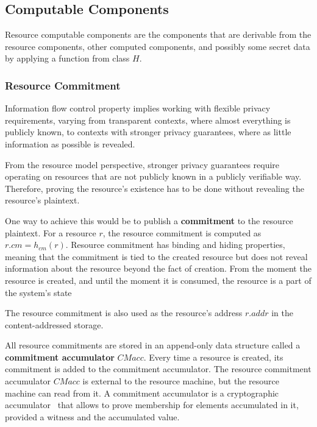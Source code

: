 \subsection{Computable Components}

Resource computable components are the components that are derivable from the resource components, other computed components, and possibly some secret data by applying a function from class $H$.

\subsubsection{Resource Commitment}

Information flow control property implies working with flexible privacy requirements, varying from transparent contexts, where almost everything is publicly known, to contexts with stronger privacy guarantees, where as little information as possible is revealed.

From the resource model perspective, stronger privacy guarantees require operating on resources that are not publicly known in a publicly verifiable way. Therefore, proving the resource's existence has to be done without revealing the resource's plaintext.

One way to achieve this would be to publish a \textbf{commitment} to the resource plaintext. For a resource $r$, the resource commitment is computed as $r.cm = h_{cm}(r)$. Resource commitment has binding and hiding properties, meaning that the commitment is tied to the created resource but does not reveal information about the resource beyond the fact of creation. From the moment the resource is created, and until the moment it is consumed, the resource is a part of the system's state

\begin{remark}
    The resource commitment is also used as the resource's address $r.addr$ in the content-addressed storage.
\end{remark}

All resource commitments are stored in an append-only data structure called a \textbf{commitment accumulator} $CMacc$. Every time a resource is created, its commitment is added to the commitment accumulator. The resource commitment accumulator $CMacc$ is external to the resource machine, but the resource machine can read from it. A commitment accumulator is a cryptographic accumulator~\citep{DBLP:journals/corr/abs-2103-04330} that allows to prove membership for elements accumulated in it, provided a witness and the accumulated value.

